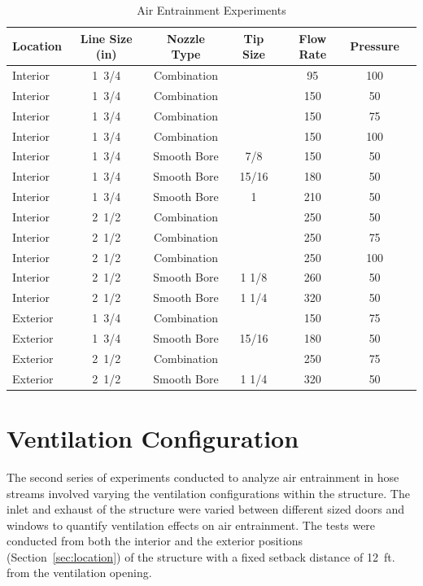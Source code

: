 \documentclass[12pt,oneside]{book}
\begin{document}
\begin{table}[!ht]
\centering
\caption{Air Entrainment Experiments}
\label{tab:Total_Air_Entrainment_Experiments}
\begin{tabular}{lcccccc}
\toprule[1.5pt]
Location & Line Size (in) & Nozzle Type & Tip Size & Flow Rate & Pressure \\ 
\midrule
Interior & 1~3/4 & Combination &       & 95 & 100 \\
Interior & 1~3/4 & Combination &       & 150 & 50 \\
Interior & 1~3/4 & Combination &       & 150 & 75 \\
Interior & 1~3/4 & Combination &       & 150 & 100 \\
Interior & 1~3/4 & Smooth Bore & 7/8   & 150 & 50 \\
Interior & 1~3/4 & Smooth Bore & 15/16 & 180 & 50 \\
Interior & 1~3/4 & Smooth Bore & 1     & 210 & 50 \\
\midrule
Interior & 2~1/2 & Combination &       & 250 & 50 \\
Interior & 2~1/2 & Combination &       & 250 & 75 \\
Interior & 2~1/2 & Combination &       & 250 & 100 \\
Interior & 2~1/2 & Smooth Bore & 1 1/8 & 260 & 50 \\
Interior & 2~1/2 & Smooth Bore & 1 1/4 & 320 & 50 \\
\midrule
Exterior & 1~3/4 & Combination &       & 150 & 75 \\
Exterior & 1~3/4 & Smooth Bore & 15/16 & 180 & 50 \\
\midrule
Exterior & 2~1/2 & Combination &       & 250 & 75 \\
Exterior & 2~1/2 & Smooth Bore & 1 1/4 & 320 & 50 \\
\bottomrule[1.25pt]
\end{tabular}
\end{table}

\clearpage

\section{Ventilation Configuration}

The second series of experiments conducted to analyze air entrainment in hose streams involved varying the ventilation configurations within the structure. The inlet and exhaust of the structure were varied between different sized doors and windows to quantify ventilation effects on air entrainment. The tests were conducted from both the interior and the exterior positions (Section~\ref{sec:location}) of the structure with a fixed setback distance of 12~ft. from the ventilation opening.
\end{document}
